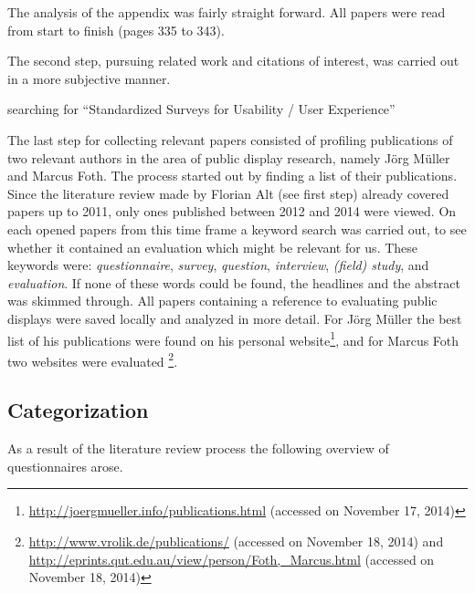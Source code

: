 	The analysis of the appendix was fairly straight forward. All papers were read from start to finish (pages 335 to 343). 

	The second step, pursuing related work and citations of interest, was carried out in a more subjective manner.


		searching for ``Standardized Surveys for Usability / User Experience''



	The last step for collecting relevant papers consisted of profiling publications of two relevant authors in the area of public display research, namely J\"org M\"uller and Marcus Foth. The process started out by finding a list of their publications. Since the literature review made by Florian Alt (see first step) already covered papers up to 2011, only ones published between 2012 and 2014 were viewed. 
	On each opened papers from this time frame a keyword search was carried out, to see whether it contained an evaluation which might be relevant for us. These keywords were: \textit{questionnaire}, \textit{survey}, \textit{question}, \textit{interview}, \textit{(field) study}, and \textit{evaluation}. If none of these words could be found, the headlines and the abstract was skimmed through. All papers containing a reference to evaluating public displays were saved locally and analyzed in more detail.
	For J\"org M\"uller the best list of his publications were found on his personal website\footnote{\url{http://joergmueller.info/publications.html} (accessed on November 17, 2014)}, and for Marcus Foth two websites were evaluated \footnote{\url{http://www.vrolik.de/publications/} (accessed on November 18, 2014) and \url{http://eprints.qut.edu.au/view/person/Foth,_Marcus.html} (accessed on November 18, 2014)}. 






\subsection{Categorization}

	As a result of the literature review process the following overview of questionnaires arose. 

